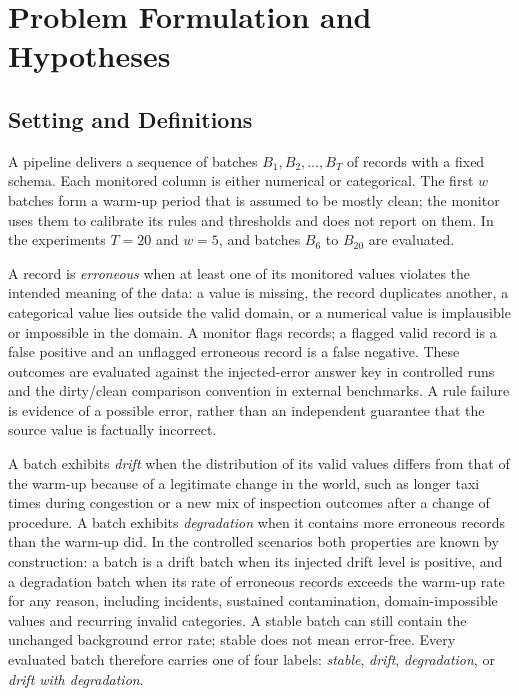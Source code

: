 \section{Problem Formulation and Hypotheses}
\label{sec:problem}

\subsection{Setting and Definitions}

A pipeline delivers a sequence of batches $B_1, B_2, \ldots, B_T$ of records with a fixed schema. Each monitored column is either numerical or categorical. The first $w$ batches form a warm-up period that is assumed to be mostly clean; the monitor uses them to calibrate its rules and thresholds and does not report on them. In the experiments $T = 20$ and $w = 5$, and batches $B_6$ to $B_{20}$ are evaluated.

A record is \emph{erroneous} when at least one of its monitored values violates the intended meaning of the data: a value is missing, the record duplicates another, a categorical value lies outside the valid domain, or a numerical value is implausible or impossible in the domain. A monitor flags records; a flagged valid record is a false positive and an unflagged erroneous record is a false negative. These outcomes are evaluated against the injected-error answer key in controlled runs and the dirty/clean comparison convention in external benchmarks. A rule failure is evidence of a possible error, rather than an independent guarantee that the source value is factually incorrect.

A batch exhibits \emph{drift} when the distribution of its valid values differs from that of the warm-up because of a legitimate change in the world, such as longer taxi times during congestion or a new mix of inspection outcomes after a change of procedure. A batch exhibits \emph{degradation} when it contains more erroneous records than the warm-up did. In the controlled scenarios both properties are known by construction: a batch is a drift batch when its injected drift level is positive, and a degradation batch when its rate of erroneous records exceeds the warm-up rate for any reason, including incidents, sustained contamination, domain-impossible values and recurring invalid categories. A stable batch can still contain the unchanged background error rate; stable does not mean error-free. Every evaluated batch therefore carries one of four labels: \emph{stable}, \emph{drift}, \emph{degradation}, or \emph{drift with degradation}.

